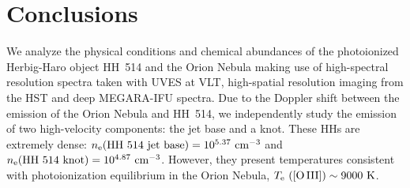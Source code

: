 \documentclass[fleqn,usenatbib]{mnras}
\begin{document}
 







\section{Conclusions}
\label{sec:summary_and_conclusions}
We analyze the physical conditions and chemical abundances of the photoionized Herbig-Haro object HH~514 and the Orion Nebula making use of high-spectral resolution spectra taken with UVES at VLT, high-spatial resolution imaging from the HST and deep MEGARA-IFU spectra.  
Due to the Doppler shift between the emission of the Orion Nebula and HH~514, we independently study the emission of two high-velocity components: the jet base and a knot. These HHs are extremely dense: $n_{\rm e}(\text{HH~514~jet base})=10^{5.37} \text{ cm}^{-3}$ and $n_{\rm e}(\text{HH~514~knot})=10^{4.87} \text{ cm}^{-3}$. However, they present temperatures consistent with  photoionization equilibrium in the Orion Nebula, $T_{\rm e} \text{ ([O\thinspace III])} \sim 9000\text{ K}$.
\end{document}
